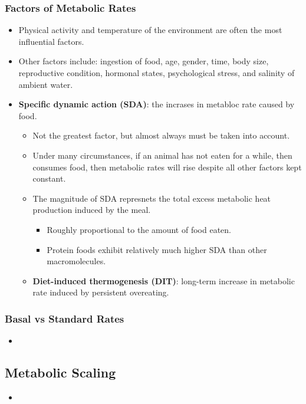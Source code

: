 \documentclass[12pt,a4paper]{article}
\begin{document}
\begin{itemize}
    \subsubsection{Factors of Metabolic Rates}
    \begin{itemize}
        \item {\color{o-Sun}Physical activity} and {\color{o-Sun}temperature of the environment} are often the most influential factors.
        \item Other factors include: ingestion of food, age, gender, time, body size, reproductive condition, hormonal states, psychological stress, and salinity of ambient water.
        \item \textbf{Specific dynamic action (SDA)}: the incrases in metabloc rate caused by food.
            \begin{itemize}
                \item Not the greatest factor, but almost always must be taken into account.
                \item Under many circumstances, if an animal has not eaten for a while, then consumes food, then metabolic rates will rise despite all other factors kept constant.
                \item The {\color{o-Sun}magnitude} of SDA represnets the total excess metabolic heat production induced by the meal.
                    \begin{itemize}
                        \item Roughly proportional to the amount of food eaten.
                        \item Protein foods exhibit relatively much higher SDA than other macromolecules.
                    \end{itemize}
                \item \textbf{Diet-induced thermogenesis (DIT)}: long-term increase in metabolic rate induced by persistent overeating.
            \end{itemize}
    \end{itemize}
    \subsubsection{Basal vs Standard Rates}
    \begin{itemize}
        \item 
    \end{itemize}
\end{itemize}

\subsection{Metabolic Scaling}
\begin{itemize}
    \item 
\end{itemize}





\clearpage
{}

\end{document}
